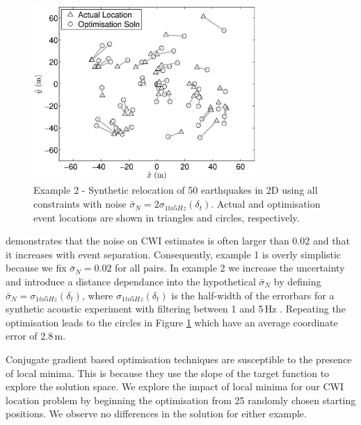 \documentclass[extra]{gji}
\begin{document}
\begin{figure}
\includegraphics[width = 20pc]{diags/locs_2D_50eq_3.eps}
\caption{Example 2 - Synthetic relocation of 50 earthquakes in 2D
using all constraints with noise $\bar{\sigma}_N= 2
\sigma_{1to5Hz}(\delta_t)$.
 Actual and optimisation event locations
are shown in triangles and circles, respectively.}
\label{fig-2D50eq-relocation_eg3}
\end{figure}
\citet{dr_Robinson11a} demonstrates that the noise on CWI estimates
is often larger than 0.02 and that it increases with event
separation. Consequently, example 1 is overly simplistic because we
fix $\bar{\sigma}_N=0.02$ for all pairs. In example 2 we increase
the uncertainty and introduce a distance dependance into the
hypothetical $\bar{\sigma}_N$ by defining
$\bar{\sigma}_N=\sigma_{1to5Hz}(\delta_t)$, where
$\sigma_{1to5Hz}(\delta_t)$ is the half-width of the errorbars for a
synthetic acoustic experiment with filtering between 1 and 5\,Hz
\citep[see Fig. 4(b) of ][]{dr_Robinson11a}. Repeating the
optimisation leads to the circles in Figure
\ref{fig-2D50eq-relocation_eg3} which have an average coordinate
error of 2.8\,m.

Conjugate gradient based optimisation techniques are susceptible to
the presence of local minima. This is because they use the slope of
the target function to explore the solution space. We explore the
impact of local minima for our CWI location problem by beginning the
optimisation from 25 randomly chosen starting positions. We observe
no differences in the solution for either example.
\end{document}
